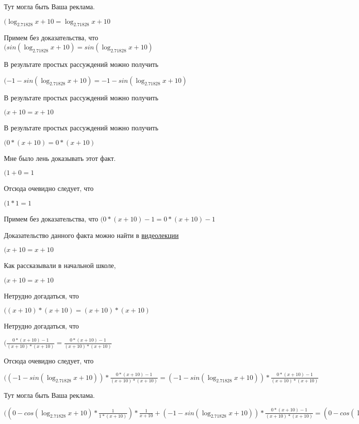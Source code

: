 \documentclass[12pt,a4paper,fleqn]{article}
\theoremstyle{definition}
\begin{document}
Тут могла быть Ваша реклама.

$(\log_{ 2.71828 }{ x  +  10 } = \log_{ 2.71828 }{ x  +  10 }$

Примем без доказательства, что
$(sin(\log_{ 2.71828 }{ x  +  10 }) = sin(\log_{ 2.71828 }{ x  +  10 })$

В результате простых рассуждений можно получить

$( -1  - sin(\log_{ 2.71828 }{ x  +  10 }) =  -1  - sin(\log_{ 2.71828 }{ x  +  10 })$

В результате простых рассуждений можно получить

$( x  +  10  =  x  +  10 $

В результате простых рассуждений можно получить

$( 0  * ( x  +  10 ) =  0  * ( x  +  10 )$

Мне было лень доказывать этот факт.

$( 1  +  0  =  1 $

Отсюда очевидно следует, что

$( 1  *  1  =  1 $

Примем без доказательства, что
$( 0  * ( x  +  10 ) -  1  =  0  * ( x  +  10 ) -  1 $

Доказательство данного факта можно найти в \href{https://www.youtube.com/watch?v=dQw4w9WgXcQ}{видеолекции}

$( x  +  10  =  x  +  10 $

Как рассказывали в начальной школе,

$( x  +  10  =  x  +  10 $

Нетрудно догадаться, что

$(( x  +  10 ) * ( x  +  10 ) = ( x  +  10 ) * ( x  +  10 )$

Нетрудно догадаться, что

$(\frac{ 0  * ( x  +  10 ) -  1 }{( x  +  10 ) * ( x  +  10 )}
 = \frac{ 0  * ( x  +  10 ) -  1 }{( x  +  10 ) * ( x  +  10 )}
$

Отсюда очевидно следует, что

$(( -1  - sin(\log_{ 2.71828 }{ x  +  10 })) * \frac{ 0  * ( x  +  10 ) -  1 }{( x  +  10 ) * ( x  +  10 )}
 = ( -1  - sin(\log_{ 2.71828 }{ x  +  10 })) * \frac{ 0  * ( x  +  10 ) -  1 }{( x  +  10 ) * ( x  +  10 )}
$

Тут могла быть Ваша реклама.

$(( 0  - cos(\log_{ 2.71828 }{ x  +  10 }) * \frac{ 1 }{ 1  * ( x  +  10 )}
) * \frac{ 1 }{ x  +  10 }
 + ( -1  - sin(\log_{ 2.71828 }{ x  +  10 })) * \frac{ 0  * ( x  +  10 ) -  1 }{( x  +  10 ) * ( x  +  10 )}
 = ( 0  - cos(\log_{ 2.71828 }{ x  +  10 }) * \frac{ 1 }{ 1  * ( x  +  10 )}
) * \frac{ 1 }{ x  +  10 }
 + ( -1  - sin(\log_{ 2.71828 }{ x  +  10 })) * \frac{ 0  * ( x  +  10 ) -  1 }{( x  +  10 ) * ( x  +  10 )}
$
\end{document}
